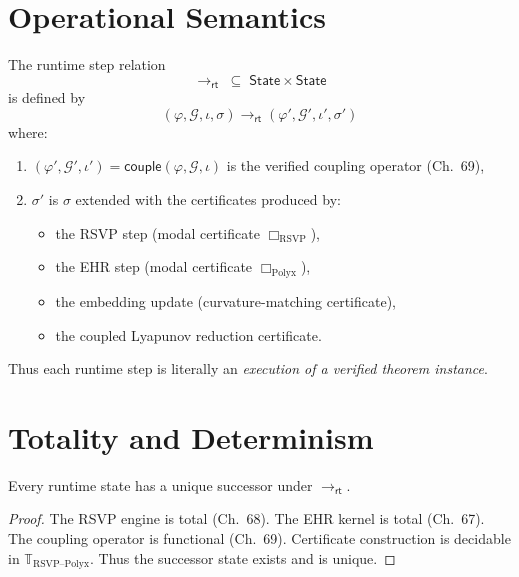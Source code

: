 \section{Operational Semantics}

\begin{definition}
The runtime step relation
\[
\longrightarrow_{\mathsf{rt}}
  \;\subseteq\;
  \mathsf{State} \times \mathsf{State}
\]
is defined by
\[
(\varphi,\mathcal{G},\iota,\sigma)
  \longrightarrow_{\mathsf{rt}}
(\varphi',\mathcal{G}',\iota',\sigma')
\]
where:
\begin{enumerate}
\item $(\varphi',\mathcal{G}',\iota')=\mathsf{couple}(\varphi,\mathcal{G},\iota)$  
      is the verified coupling operator (Ch.~69),
\item $\sigma'$ is $\sigma$ extended with the certificates produced by:
      \begin{itemize}
      \item the RSVP step (modal certificate $\Box_{\mathrm{RSVP}}$),
      \item the EHR step (modal certificate $\Box_{\mathrm{Polyx}}$),
      \item the embedding update (curvature-matching certificate),
      \item the coupled Lyapunov reduction certificate.
      \end{itemize}
\end{enumerate}
\end{definition}

Thus each runtime step is literally an \emph{execution of a verified theorem
instance}.

\section{Totality and Determinism}

\begin{theorem}[Totality]
Every runtime state has a unique successor under $\longrightarrow_{\mathsf{rt}}$.
\end{theorem}

\begin{proof}
The RSVP engine is total (Ch.~68).  
The EHR kernel is total (Ch.~67).  
The coupling operator is functional (Ch.~69).  
Certificate construction is decidable in $\mathbb{T}_{\mathrm{RSVP\text{--}Polyx}}$.  
Thus the successor state exists and is unique.
\end{proof}

